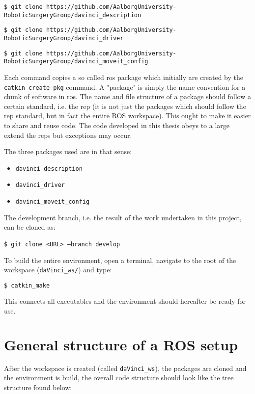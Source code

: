 \hspace{0cm} \texttt{\$ git clone https://github.com/AalborgUniversity-RoboticSurgeryGroup/davinci\_description}

\hspace{0cm} \texttt{\$ git clone https://github.com/AalborgUniversity-RoboticSurgeryGroup/davinci\_driver}

\hspace{0cm} \texttt{\$ git clone https://github.com/AalborgUniversity-RoboticSurgeryGroup/davinci\_moveit\_config}\vspace{0.2cm}

Each command copies a so called \gls{ros} package which initially are created by the \texttt{catkin\_create\_pkg} command. A "package" is simply the name convention for a chunk of software in \gls{ros}. The name and file structure of a package should follow a certain standard, i.e. the \gls{rep} (it is not just the packages which should follow the \gls{rep} standard, but in fact the entire ROS workspace). This ought to make it easier to share and reuse code. The code developed in this thesis obeys to a large extend the \gls{rep}s but exceptions may occur. 

The three packages used are in that sense:
\begin{itemize}
\item \texttt{davinci\_description}
\item \texttt{davinci\_driver}
\item \texttt{davinci\_moveit\_config}
\end{itemize}
The development branch, i.e. the result of the work undertaken in this project, can be cloned as:

\hspace{0cm} \texttt{\$ git clone <URL> ---branch develop} \ \ \ {}


To build the entire environment, open a terminal, navigate to the root of the workspace (\texttt{daVinci\_ws/}) and type:

\hspace{1cm} \texttt{\$ catkin\_make}

This connects all executables and the environment should hereafter be ready for use.
\section{General structure of a ROS setup}
After the workspace is created (called \texttt{daVinci\_ws}), the packages are cloned and the environment is build, the overall code structure should look like the tree structure found below:

